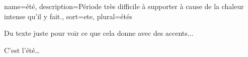 \documentclass[frenchb,pdftex]{scrartcl}
\begin{document}

{%
	name={été},
	description={Période très difficile à supporter à cause de la chaleur intense qu'il y fait.},
	sort={ete},
	plural={étés}
}

Du texte juste pour voir ce que cela donne avec des accents...


C'est l'\gls{été}\dots
\end{document}
